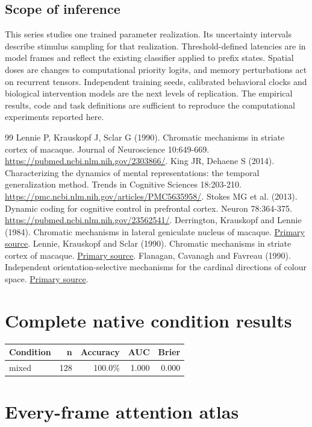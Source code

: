 \documentclass[11pt]{article}
\begin{document}
\subsection{Scope of inference}
This series studies one trained parameter realization. Its uncertainty intervals describe stimulus sampling for that realization. Threshold-defined latencies are in model frames and reflect the existing classifier applied to prefix states. Spatial doses are changes to computational priority logits, and memory perturbations act on recurrent tensors. Independent training seeds, calibrated behavioral clocks and biological intervention models are the next levels of replication. The empirical results, code and task definitions are sufficient to reproduce the computational experiments reported here.

\begin{thebibliography}{99}
 Lennie P, Krauskopf J, Sclar G (1990). Chromatic mechanisms in striate cortex of macaque. Journal of Neuroscience 10:649-669. \url{https://pubmed.ncbi.nlm.nih.gov/2303866/}.
 King JR, Dehaene S (2014). Characterizing the dynamics of mental representations: the temporal generalization method. Trends in Cognitive Sciences 18:203-210. \url{https://pmc.ncbi.nlm.nih.gov/articles/PMC5635958/}.
 Stokes MG et al. (2013). Dynamic coding for cognitive control in prefrontal cortex. Neuron 78:364-375. \url{https://pubmed.ncbi.nlm.nih.gov/23562541/}.
 Derrington, Krauskopf and Lennie (1984). Chromatic mechanisms in lateral geniculate nucleus of macaque. \href{https://pubmed.ncbi.nlm.nih.gov/6512691/}{Primary source}.
 Lennie, Krauskopf and Sclar (1990). Chromatic mechanisms in striate cortex of macaque. \href{https://pubmed.ncbi.nlm.nih.gov/2303866/}{Primary source}.
 Flanagan, Cavanagh and Favreau (1990). Independent orientation-selective mechanisms for the cardinal directions of colour space. \href{https://pubmed.ncbi.nlm.nih.gov/2378069/}{Primary source}.
\end{thebibliography}\clearpage\appendix\section{Complete native condition results}
\small\begin{longtable}{p{}rrrr}\toprule Condition & n & Accuracy & AUC & Brier\\\midrule\endhead
mixed & 128 & 100.0\% & 1.000 & 0.000\\
\bottomrule\end{longtable}\normalsize\section{Every-frame attention atlas}
\end{document}
